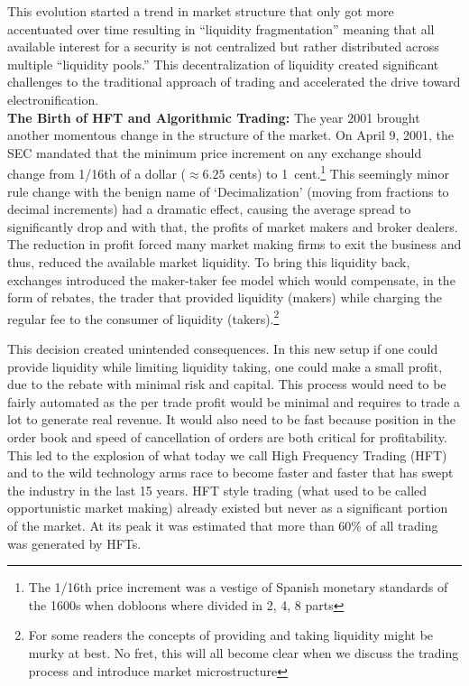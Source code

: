 This evolution started a trend in market structure that only got more accentuated over time resulting in ``liquidity fragmentation'' meaning that all available interest for a security is not centralized but rather distributed across multiple ``liquidity pools.''  This decentralization of liquidity created significant challenges to the traditional approach of trading and accelerated the drive toward electronification. \\


\noindent\textbf{The Birth of HFT and Algorithmic Trading:} The year 2001 brought another momentous change in the structure of the market. On April 9, 2001, the SEC mandated that the minimum price increment on any exchange should change from 1/16th of a dollar ($\approx6.25$ cents) to 1~cent.\footnote{ The 1/16th price increment was a vestige of Spanish monetary standards of the 1600s when dobloons where divided in 2, 4, 8 parts} This seemingly minor rule change with the benign name of `Decimalization' (moving from fractions to decimal increments) had a dramatic effect, causing the average spread to significantly drop and with that, the profits of market makers and broker dealers. The reduction in profit forced many market making firms to exit the business and thus, reduced the  available market liquidity. To bring this liquidity back, exchanges introduced the maker-taker fee model which would compensate, in the form of rebates, the trader that provided liquidity (makers) while charging the regular fee to the consumer of liquidity (takers).\footnote{For some readers the concepts of providing and taking liquidity might be murky at best. No fret, this will all become clear when we discuss the trading process and introduce market microstructure}


This decision created unintended consequences. In this new setup if one could provide liquidity while limiting liquidity taking, one could make a small profit, due to the rebate with minimal risk and capital. This process would need to be fairly automated as the per trade profit would be minimal and requires to trade a lot to generate real revenue. It would also need to be fast because position in the order book and speed of cancellation of orders are both critical for profitability. This led to the explosion of what today we call High Frequency Trading (HFT) and to the wild technology arms race to become faster and faster that has swept the industry in the last 15 years. HFT style trading (what used to be called opportunistic market making) already existed but never as a significant portion of the market. At its peak it was estimated that more than 60\% of all trading was generated by HFTs.


